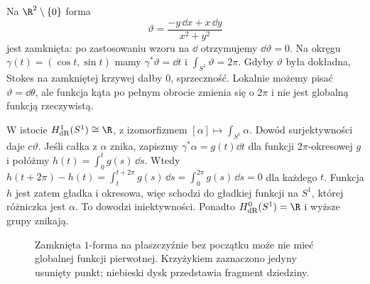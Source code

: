 \begin{przyklad}
\label{prz:de-rham-s1}
Na $\R^2\setminus\{0\}$ forma
\[
 \vartheta=\frac{-y\,\dd x+x\,\dd y}{x^2+y^2}
\]
jest zamknięta: po zastosowaniu wzoru na $\dd$
otrzymujemy $\dd\vartheta=0$. Na okręgu
$\gamma(t)=(\cos t,\sin t)$ mamy
$\gamma^*\vartheta=\dd t$ i
$\int_{S^1}\vartheta=2\pi$. Gdyby $\vartheta$
była dokładna, Stokes na zamkniętej krzywej
dałby $0$, sprzeczność. Lokalnie możemy
pisać $\vartheta=\dd\theta$, ale funkcja kąta
po pełnym obrocie zmienia się o $2\pi$ i nie
jest globalną funkcją rzeczywistą.

W istocie $H^1_{\mathrm{dR}}(S^1)\cong\R$,
z izomorfizmem $[\alpha]\mapsto\int_{S^1}\alpha$.
Dowód surjektywności daje $c\vartheta$.
Jeśli całka z $\alpha$ znika, zapiszmy
$\gamma^*\alpha=g(t)\dd t$ dla funkcji
$2\pi$-okresowej $g$ i połóżmy
$h(t)=\int_0^t g(s)\,\dd s$. Wtedy
$h(t+2\pi)-h(t)=\int_t^{t+2\pi}g(s)\,\dd s
=\int_0^{2\pi}g(s)\,\dd s=0$ dla każdego $t$.
Funkcja $h$ jest zatem gładka i okresowa, więc schodzi
do gładkiej funkcji na $S^1$, której różniczka jest $\alpha$.
To dowodzi iniektywności. Ponadto
$H^0_{\mathrm{dR}}(S^1)=\R$ i wyższe grupy znikają.
\end{przyklad}

\begin{figure}[!htbp]
\centering
{}
\caption{Zamknięta $1$-forma na płaszczyźnie bez początku
może nie mieć globalnej funkcji pierwotnej.
Krzyżykiem zaznaczono jedyny usunięty punkt; niebieski
dysk przedstawia fragment dziedziny.}
\label{fig:de-rham-kat}
\end{figure}

